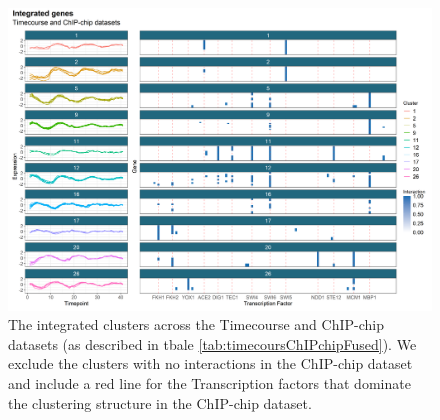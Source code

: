 \documentclass[]{article}
\begin{document}
%
\begin{figure}
	\centering
	\includegraphics[scale=0.6]{./Images/Yeast/timecourseChIPchipFused.png}
	\caption{The integrated clusters across the Timecourse and ChIP-chip datasets (as described in tbale \ref{tab:timecoursChIPchipFused}). We exclude the clusters with no interactions in the ChIP-chip dataset and include a red line for the Transcription factors that dominate the clustering structure in the ChIP-chip dataset.}
	\label{fig:timepointChIPchipFused}
\end{figure}
\end{document}
